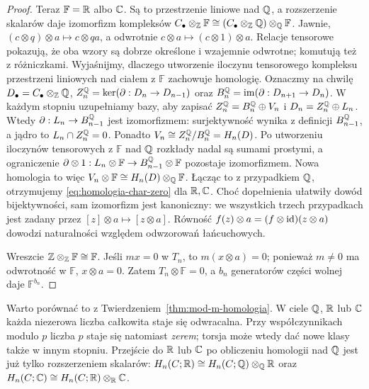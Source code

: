 \begin{proof}
Teraz $\mathbb F=\mathbb{R}$ albo $\mathbb{C}$.
Są to przestrzenie liniowe nad $\mathbb{Q}$, a
rozszerzenie skalarów daje izomorfizm
kompleksów $C_\bullet\otimes_{\mathbb{Z}}\mathbb F
\cong (C_\bullet\otimes_{\mathbb{Z}}\mathbb{Q})\otimes_{\mathbb{Q}}\mathbb F$.
Jawnie, $(c\otimes q)\otimes a\mapsto c\otimes qa$,
a odwrotnie $c\otimes a\mapsto(c\otimes1)\otimes a$.
Relacje tensorowe pokazują, że oba wzory są dobrze określone
i wzajemnie odwrotne; komutują też z różniczkami.
Wyjaśnijmy, dlaczego utworzenie iloczynu tensorowego kompleksu
przestrzeni liniowych nad ciałem z $\mathbb F$ zachowuje
homologię. Oznaczmy na chwilę
$D_\bullet=C_\bullet\otimes_{\mathbb{Z}}\mathbb{Q}$,
$Z_n^{\mathbb{Q}}=\ker(\partial:D_n\to D_{n-1})$
oraz $B_n^{\mathbb{Q}}=\operatorname{im}(\partial:D_{n+1}\to D_n)$.
W każdym stopniu uzupełniamy bazy, aby zapisać
$Z_n^{\mathbb{Q}}=B_n^{\mathbb{Q}}\oplus V_n$ i
$D_n=Z_n^{\mathbb{Q}}\oplus L_n$.
Wtedy $\partial:L_n\to B_{n-1}^{\mathbb{Q}}$ jest
izomorfizmem: surjektywność wynika z definicji
$B_{n-1}^{\mathbb{Q}}$, a jądro to
$L_n\cap Z_n^{\mathbb{Q}}=0$. Ponadto
$V_n\cong Z_n^{\mathbb{Q}}/B_n^{\mathbb{Q}}=H_n(D)$.
Po utworzeniu iloczynów tensorowych z $\mathbb F$ nad $\mathbb{Q}$ rozkłady nadal
są sumami prostymi, a ograniczenie
$\partial\otimes1:L_n\otimes\mathbb F
\to B_{n-1}^{\mathbb{Q}}\otimes\mathbb F$ pozostaje
izomorfizmem. Nowa homologia to więc
$V_n\otimes\mathbb F
\cong H_n(D)\otimes_{\mathbb{Q}}\mathbb F$.
Łącząc to z przypadkiem $\mathbb{Q}$, otrzymujemy
\eqref{eq:homologia-char-zero} dla $\mathbb{R},\mathbb{C}$.
Choć dopełnienia ułatwiły dowód bijektywności, sam izomorfizm
jest kanoniczny: we wszystkich trzech przypadkach jest zadany
przez $[z]\otimes a\mapsto[z\otimes a]$.
Równość $f(z)\otimes a=(f\otimes\mathrm{id})(z\otimes a)$ dowodzi
naturalności względem odwzorowań łańcuchowych.

Wreszcie $\mathbb{Z}\otimes_{\mathbb{Z}}\mathbb F\cong\mathbb F$.
Jeśli $mx=0$ w $T_n$, to
$m(x\otimes a)=0$; ponieważ $m\ne0$
ma odwrotność w $\mathbb F$,
$x\otimes a=0$. Zatem $T_n\otimes\mathbb F=0$,
a $b_n$ generatorów części wolnej daje
$\mathbb F^{b_n}$.
\end{proof}

Warto porównać to z Twierdzeniem~\ref{thm:mod-m-homologia}.
W ciele $\mathbb{Q}$, $\mathbb{R}$ lub $\mathbb{C}$ każda niezerowa
liczba całkowita staje się odwracalna.
Przy współczynnikach modulo $p$ liczba $p$
staje się natomiast \emph{zerem}; torsja
może wtedy dać nowe klasy także w innym stopniu.
Przejście do $\mathbb{R}$ lub $\mathbb{C}$ po obliczeniu
homologii nad $\mathbb{Q}$ jest już tylko
rozszerzeniem skalarów: $H_n(C;\mathbb{R})\cong H_n(C;\mathbb{Q})\otimes_{\mathbb{Q}}\mathbb{R}$
oraz $H_n(C;\mathbb{C})\cong H_n(C;\mathbb{R})\otimes_{\mathbb{R}}\mathbb{C}$.

